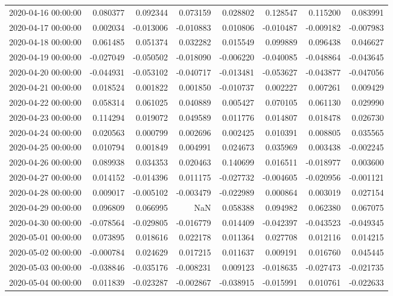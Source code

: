 \begin{tabular}{lrrrrrrr}
2020-04-16 00:00:00 & 0.080377 & 0.092344 & 0.073159 & 0.028802 & 0.128547 & 0.115200 & 0.083991 \\
2020-04-17 00:00:00 & 0.002034 & -0.013006 & -0.010883 & 0.010806 & -0.010487 & -0.009182 & -0.007983 \\
2020-04-18 00:00:00 & 0.061485 & 0.051374 & 0.032282 & 0.015549 & 0.099889 & 0.096438 & 0.046627 \\
2020-04-19 00:00:00 & -0.027049 & -0.050502 & -0.018090 & -0.006220 & -0.040085 & -0.048864 & -0.043645 \\
2020-04-20 00:00:00 & -0.044931 & -0.053102 & -0.040717 & -0.013481 & -0.053627 & -0.043877 & -0.047056 \\
2020-04-21 00:00:00 & 0.018524 & 0.001822 & 0.001850 & -0.010737 & 0.002227 & 0.007261 & 0.009429 \\
2020-04-22 00:00:00 & 0.058314 & 0.061025 & 0.040889 & 0.005427 & 0.070105 & 0.061130 & 0.029990 \\
2020-04-23 00:00:00 & 0.114294 & 0.019072 & 0.049589 & 0.011776 & 0.014807 & 0.018478 & 0.026730 \\
2020-04-24 00:00:00 & 0.020563 & 0.000799 & 0.002696 & 0.002425 & 0.010391 & 0.008805 & 0.035565 \\
2020-04-25 00:00:00 & 0.010794 & 0.001849 & 0.004991 & 0.024673 & 0.035969 & 0.003438 & -0.002245 \\
2020-04-26 00:00:00 & 0.089938 & 0.034353 & 0.020463 & 0.140699 & 0.016511 & -0.018977 & 0.003600 \\
2020-04-27 00:00:00 & 0.014152 & -0.014396 & 0.011175 & -0.027732 & -0.004605 & -0.020956 & -0.001121 \\
2020-04-28 00:00:00 & 0.009017 & -0.005102 & -0.003479 & -0.022989 & 0.000864 & 0.003019 & 0.027154 \\
2020-04-29 00:00:00 & 0.096809 & 0.066995 & NaN & 0.058388 & 0.094982 & 0.062380 & 0.067075 \\
2020-04-30 00:00:00 & -0.078564 & -0.029805 & -0.016779 & 0.014409 & -0.042397 & -0.043523 & -0.049345 \\
2020-05-01 00:00:00 & 0.073895 & 0.018616 & 0.022178 & 0.011364 & 0.027708 & 0.012116 & 0.014215 \\
2020-05-02 00:00:00 & -0.000784 & 0.024629 & 0.017215 & 0.011637 & 0.009191 & 0.016760 & 0.045445 \\
2020-05-03 00:00:00 & -0.038846 & -0.035176 & -0.008231 & 0.009123 & -0.018635 & -0.027473 & -0.021735 \\
2020-05-04 00:00:00 & 0.011839 & -0.023287 & -0.002867 & -0.038915 & -0.015991 & 0.010761 & -0.022633 \\

\end{tabular}
